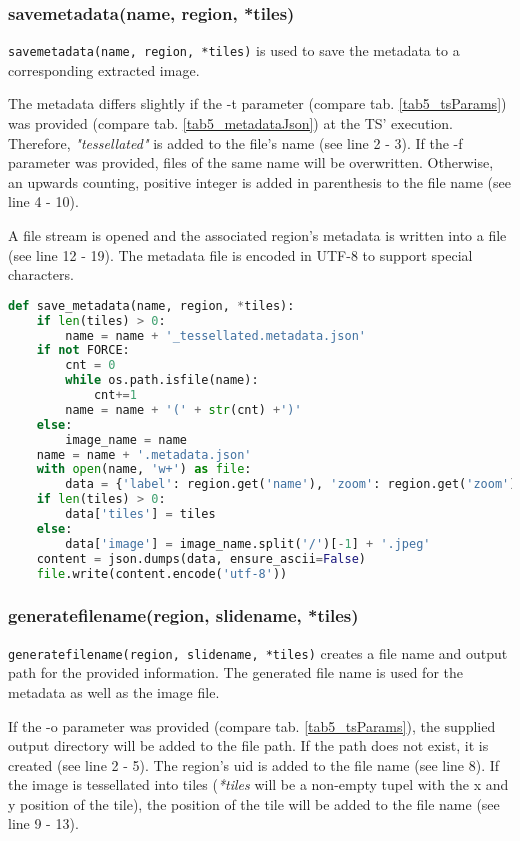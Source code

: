 \subsubsection{save{\textunderscore}metadata(name, region, *tiles)}

\texttt{save{\textunderscore}metadata(name, region, *tiles)} is used to save the metadata to a corresponding extracted image.

The metadata differs slightly if the -t parameter (compare tab. \ref{tab5_tsParams}) was provided (compare tab. \ref{tab5_metadataJson}) at the TS' execution. Therefore, \emph{"{\textunderscore}tessellated"} is added to the file's name (see line 2 - 3). If the -f parameter was provided, files of the same name will be overwritten. Otherwise, an upwards counting, positive integer is added in parenthesis to the file name (see line 4 - 10).

A file stream is opened and the associated region's metadata is written into a file (see line 12 - 19). The metadata file is encoded in UTF-8 to support special characters.

\begin{lstlisting}[frame=single,language=python]
def save_metadata(name, region, *tiles):
	if len(tiles) > 0:
		name = name + '_tessellated.metadata.json'
	if not FORCE:
		cnt = 0
		while os.path.isfile(name):
			cnt+=1
		name = name + '(' + str(cnt) +')'
	else:
		image_name = name
	name = name + '.metadata.json'
	with open(name, 'w+') as file:
		data = {'label': region.get('name'), 'zoom': region.get('zoom'), 'context': region.get('context')}
	if len(tiles) > 0:
		data['tiles'] = tiles
	else:
		data['image'] = image_name.split('/')[-1] + '.jpeg'
	content = json.dumps(data, ensure_ascii=False)
	file.write(content.encode('utf-8'))
\end{lstlisting}


\subsubsection{generate{\textunderscore}file{\textunderscore}name(region, slide{\textunderscore}name, *tiles)}
\texttt{generate{\textunderscore}file{\textunderscore}name(region, slide{\textunderscore}name, *tiles)} creates a file name and output path for the provided information. The generated file name is used for the metadata as well as the image file.

If the -o parameter was provided (compare tab. \ref{tab5_tsParams}), the supplied output directory will be added to the file path. If the path does not exist, it is created (see line 2 - 5). The region's uid is added to the file name (see line 8). If the image is tessellated into tiles (\emph{*tiles} will be a non-empty tupel with the x and y position of the tile), the position of the tile will be added to the file name (see line 9 - 13).

